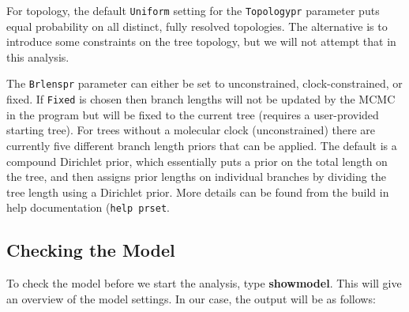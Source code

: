 \documentclass[12pt]{book}
\begin{document}
For topology, the default \texttt{Uniform} setting for the \texttt{Topologypr} parameter puts equal
 probability on all distinct, fully resolved topologies. The alternative is to introduce some constraints
 on the tree topology, but we will not attempt that in this analysis.

The \texttt{Brlenspr} parameter can either be set to unconstrained, clock-constrained, or fixed. If 
 \texttt{Fixed} is chosen then branch lengths will not be updated by the MCMC in the program but will be
  fixed to the current tree (requires a user-provided starting tree).
 For trees without a molecular clock (unconstrained) there are currently five different branch length
 priors that can be applied. The default is a compound Dirichlet prior, which essentially puts a
 prior on the total length on the tree, and then assigns prior lengths on individual branches by
 dividing the tree length using a Dirichlet prior. More details can be found from the build in
 help documentation (\texttt{help prset}.
 

\subsection{Checking the Model}

To check the model before we start the analysis, type \textbf{showmodel}. This will give an overview of the
 model settings. In our case, the output will be as follows:
\end{document}
